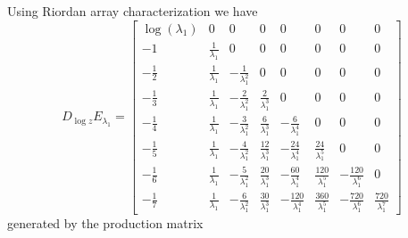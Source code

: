 Using Riordan array characterization we have 
\begin{displaymath}
D_{\log{z}}E_{\lambda_{1}} = \left[\begin{matrix}\log{\left (\lambda_{1} \right )} & 0 & 0 & 0 & 0 & 0 & 0 & 0\\-1 & \frac{1}{\lambda_{1}} & 0 & 0 & 0 & 0 & 0 & 0\\- \frac{1}{2} & \frac{1}{\lambda_{1}} & - \frac{1}{\lambda_{1}^{2}} & 0 & 0 & 0 & 0 & 0\\- \frac{1}{3} & \frac{1}{\lambda_{1}} & - \frac{2}{\lambda_{1}^{2}} & \frac{2}{\lambda_{1}^{3}} & 0 & 0 & 0 & 0\\- \frac{1}{4} & \frac{1}{\lambda_{1}} & - \frac{3}{\lambda_{1}^{2}} & \frac{6}{\lambda_{1}^{3}} & - \frac{6}{\lambda_{1}^{4}} & 0 & 0 & 0\\- \frac{1}{5} & \frac{1}{\lambda_{1}} & - \frac{4}{\lambda_{1}^{2}} & \frac{12}{\lambda_{1}^{3}} & - \frac{24}{\lambda_{1}^{4}} & \frac{24}{\lambda_{1}^{5}} & 0 & 0\\- \frac{1}{6} & \frac{1}{\lambda_{1}} & - \frac{5}{\lambda_{1}^{2}} & \frac{20}{\lambda_{1}^{3}} & - \frac{60}{\lambda_{1}^{4}} & \frac{120}{\lambda_{1}^{5}} & - \frac{120}{\lambda_{1}^{6}} & 0\\- \frac{1}{7} & \frac{1}{\lambda_{1}} & - \frac{6}{\lambda_{1}^{2}} & \frac{30}{\lambda_{1}^{3}} & - \frac{120}{\lambda_{1}^{4}} & \frac{360}{\lambda_{1}^{5}} & - \frac{720}{\lambda_{1}^{6}} & \frac{720}{\lambda_{1}^{7}}\end{matrix}\right]
\end{displaymath}
generated by the production matrix
